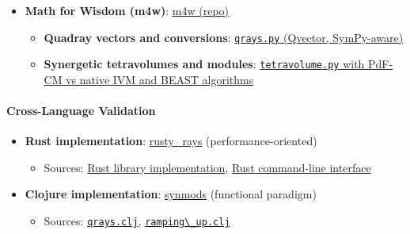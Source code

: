 \documentclass[
  10pt,
]{article}
\newcommand{\passthrough}[1]{#1}
\providecommand{\tightlist}{%
  \setlength{\itemsep}{0pt}\setlength{\parskip}{0pt}}
\begin{document}
\begin{itemize}
\tightlist
\item
  \textbf{Math for Wisdom (m4w)}:
  \href{https://github.com/4dsolutions/m4w}{m4w (repo)}

  \begin{itemize}
  \tightlist
  \item
    \textbf{Quadray vectors and conversions}:
    \href{https://github.com/4dsolutions/m4w/blob/main/qrays.py}{\passthrough{\lstinline!qrays.py!}
    (Qvector, SymPy-aware)}
  \item
    \textbf{Synergetic tetravolumes and modules}:
    \href{https://github.com/4dsolutions/m4w/blob/main/tetravolume.py}{\passthrough{\lstinline!tetravolume.py!}
    with PdF-CM vs native IVM and BEAST algorithms}
  \end{itemize}
\end{itemize}

\paragraph{Cross-Language Validation}\label{cross-language-validation}

\begin{itemize}
\tightlist
\item
  \textbf{Rust implementation}:
  \href{https://github.com/4dsolutions/rusty_rays}{rusty\_rays}
  (performance-oriented)

  \begin{itemize}
  \tightlist
  \item
    Sources:
    \href{https://github.com/4dsolutions/rusty_rays/blob/master/src/lib.rs}{Rust
    library implementation},
    \href{https://github.com/4dsolutions/rusty_rays/blob/master/src/main.rs}{Rust
    command-line interface}
  \end{itemize}
\item
  \textbf{Clojure implementation}:
  \href{https://github.com/4dsolutions/synmods}{synmods} (functional
  paradigm)

  \begin{itemize}
  \tightlist
  \item
    Sources:
    \href{https://github.com/4dsolutions/synmods/blob/master/qrays.clj}{\passthrough{\lstinline!qrays.clj!}},
    \href{https://github.com/4dsolutions/synmods/blob/master/ramping_up.clj}{\passthrough{\lstinline!ramping\_up.clj!}}
  \end{itemize}
\end{itemize}
\end{document}
